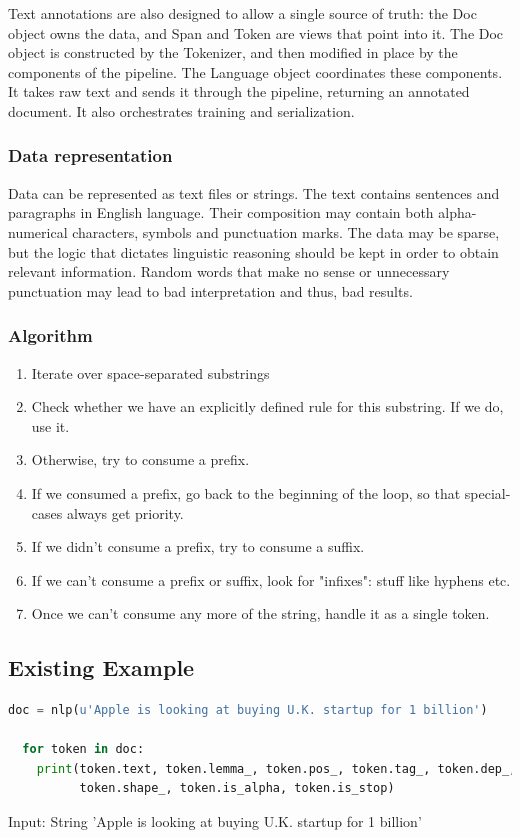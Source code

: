 \documentclass[a4paper,10pt]{article}
\begin{document}
Text annotations are also designed to allow a single source of truth: the Doc object owns the data, and Span and Token are views that point into it. The Doc object is constructed by the Tokenizer, and then modified in place by the components of the pipeline. The Language object coordinates these components. It takes raw text and sends it through the pipeline, returning an annotated document. It also orchestrates training and serialization.
  

  \subsubsection{Data representation}
  \quad Data can be represented as text files or strings. The text contains sentences and paragraphs in English language. Their composition may contain both alpha-numerical characters, symbols and punctuation marks. The data may be sparse, but the logic that dictates linguistic reasoning should be kept in order to obtain relevant information. Random words that make no sense or unnecessary punctuation may lead to bad interpretation and thus, bad results.     

  \subsubsection{Algorithm}
   \begin{enumerate}
  \item  Iterate over space-separated substrings
  \item  Check whether we have an explicitly defined rule for this substring. If we do, use it.
  \item  Otherwise, try to consume a prefix.
  \item  If we consumed a prefix, go back to the beginning of the loop, so that special-cases always get priority.
  \item  If we didn't consume a prefix, try to consume a suffix.
  \item  If we can't consume a prefix or suffix, look for "infixes": stuff like hyphens etc.
  \item Once we can't consume any more of the string, handle it as a single token.
 \end{enumerate}
 
 \subsection{Existing Example}
 \begin{lstlisting}[language=Python]
  doc = nlp(u'Apple is looking at buying U.K. startup for 1 billion')

  for token in doc:
    print(token.text, token.lemma_, token.pos_, token.tag_, token.dep_,
          token.shape_, token.is_alpha, token.is_stop)

 \end{lstlisting}
  Input: String 'Apple is looking at buying U.K. startup for 1 billion'
\end{document}
